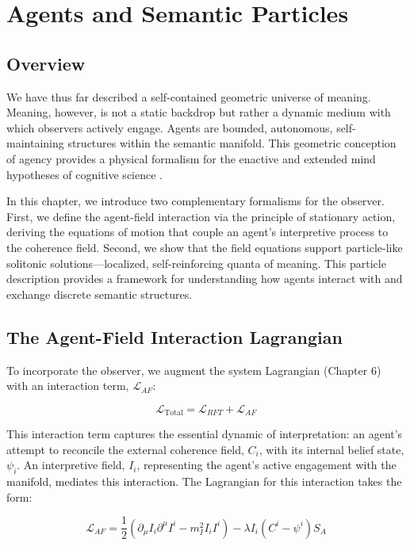 \chapter{Agents and Semantic Particles}

\section{Overview}

We have thus far described a self-contained geometric universe of meaning. Meaning, however, is not a static backdrop but rather a dynamic medium with which observers actively engage. Agents are bounded, autonomous, self-maintaining structures within the semantic manifold. This geometric conception of agency provides a physical formalism for the enactive and extended mind hypotheses of cognitive science \autocite{VarelaThompsonRosch1991, ClarkChalmers1998}.

In this chapter, we introduce two complementary formalisms for the observer. First, we define the agent-field interaction via the principle of stationary action, deriving the equations of motion that couple an agent's interpretive process to the coherence field. Second, we show that the field equations support particle-like solitonic solutions—localized, self-reinforcing quanta of meaning. This particle description provides a framework for understanding how agents interact with and exchange discrete semantic structures.

\section{The Agent-Field Interaction Lagrangian}

To incorporate the observer, we augment the system Lagrangian (Chapter 6) with an interaction term, \(\mathcal{L}_{AF}\):

\begin{equation}
\mathcal{L}_{\text{Total}} = \mathcal{L}_{RFT} + \mathcal{L}_{AF}
\end{equation}

This interaction term captures the essential dynamic of interpretation: an agent's attempt to reconcile the external coherence field, \(C_i\), with its internal belief state, \(\psi_i\). An interpretive field, \(I_i\), representing the agent's active engagement with the manifold, mediates this interaction. The Lagrangian for this interaction takes the form:

\begin{equation}
\mathcal{L}_{AF} = \frac{1}{2} \left( \partial_\mu I_i \partial^\mu I^i - m_I^2 I_i I^i \right) - \lambda I_i (C^i - \psi^i) S_A
\end{equation}

